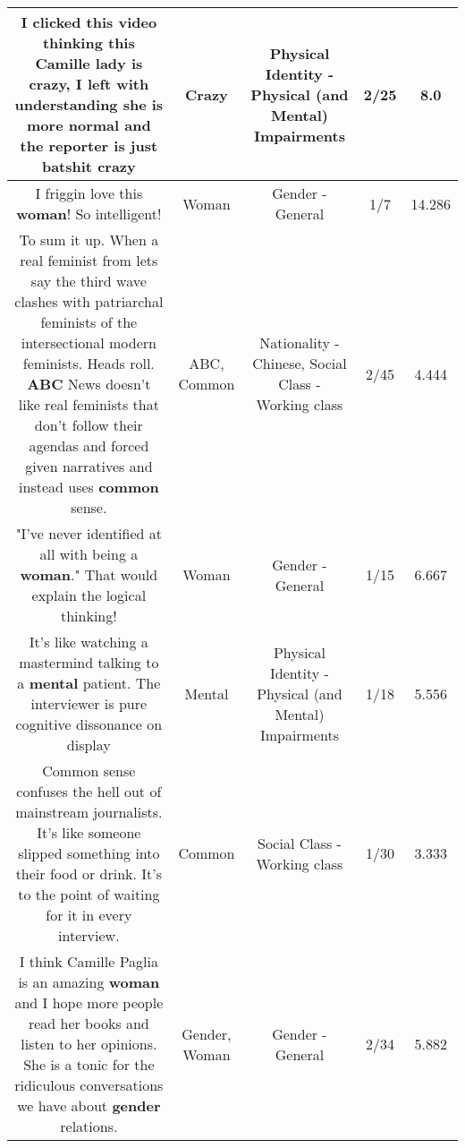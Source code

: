 \documentclass[11pt]{article}
\newlength\mylength
\begin{document}
\begin{center}
\begin{longtable}{|C{.65\mylength}|C{.30\mylength}|C{.12\mylength}|C{.12\mylength}|C{.12\mylength}|}
  \small I clicked this video thinking this Camille lady is \textbf{crazy}, I left with understanding she is more normal and the reporter is just batshit crazy\normalsize   & Crazy & Physical Identity - Physical (and Mental) Impairments & 2/25 & 8.0 \\  \hline
  \small I friggin love this \textbf{woman}! So intelligent!\normalsize   & Woman & Gender - General & 1/7 & 14.286 \\  \hline
  \small To sum it up. When a real feminist from lets say the third wave clashes with patriarchal feminists of the intersectional modern feminists. Heads roll. \textbf{ABC} News doesn't like real feminists that don't follow their agendas and forced given narratives and instead uses \textbf{common} sense.\normalsize   & ABC, Common & Nationality - Chinese, Social Class - Working class & 2/45 & 4.444 \\  \hline
  \small "I've never identified at all with being a \textbf{woman}."  That would explain the logical thinking!\normalsize   & Woman & Gender - General & 1/15 & 6.667 \\  \hline
  \small It's like watching a mastermind talking to a \textbf{mental} patient. The interviewer is pure cognitive dissonance on display\normalsize   & Mental & Physical Identity - Physical (and Mental) Impairments & 1/18 & 5.556 \\  \hline
  \small Common sense confuses the hell out of mainstream journalists. It's like someone slipped something into their food or drink. It's to the point of waiting for it in every interview.\normalsize   & Common & Social Class - Working class & 1/30 & 3.333 \\  \hline
  \small I think Camille Paglia is an amazing \textbf{woman} and I hope more people read her books and listen to her opinions.  She is a tonic for the ridiculous conversations we have about \textbf{gender} relations.\normalsize   & Gender, Woman & Gender - General & 2/34 & 5.882 \\  \hline

\end{longtable}
\end{center}
\end{document}
